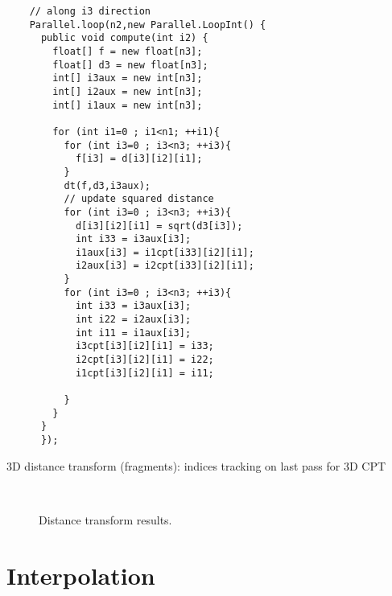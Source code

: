 \documentclass[10pt]{article}
\begin{document}
\begin{program}
\begin{verbatim}
    // along i3 direction
    Parallel.loop(n2,new Parallel.LoopInt() {
      public void compute(int i2) {
        float[] f = new float[n3]; 
        float[] d3 = new float[n3];
        int[] i3aux = new int[n3];
        int[] i2aux = new int[n3];
        int[] i1aux = new int[n3];

        for (int i1=0 ; i1<n1; ++i1){
          for (int i3=0 ; i3<n3; ++i3){
            f[i3] = d[i3][i2][i1];
          }
          dt(f,d3,i3aux);
          // update squared distance 
          for (int i3=0 ; i3<n3; ++i3){
            d[i3][i2][i1] = sqrt(d3[i3]);
            int i33 = i3aux[i3];
            i1aux[i3] = i1cpt[i33][i2][i1];
            i2aux[i3] = i2cpt[i33][i2][i1];
          }
          for (int i3=0 ; i3<n3; ++i3){
            int i33 = i3aux[i3];
            int i22 = i2aux[i3];
            int i11 = i1aux[i3];
            i3cpt[i3][i2][i1] = i33;
            i2cpt[i3][i2][i1] = i22;
            i1cpt[i3][i2][i1] = i11;
            
          }
        }
      }
      });
\end{verbatim}
  \caption{3D distance transform (fragments): indices tracking on last pass for 3D CPT}
  \label{code:3dDT}
\end{program}    



\begin{figure}[ht!]
     \begin{center}
%
        \\ %

    \end{center}
    \caption{Distance transform results.}
   \label{fig:DT}
\end{figure}

\section{Interpolation}
\end{document}
